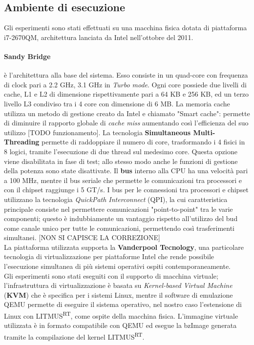\newpage

\subsection{Ambiente di esecuzione}
\label{sec:ambiente}

\noindent Gli esperimenti sono stati effettuati su una macchina fisica dotata di piattaforma i7-2670QM, architettura lanciata da Intel nell'ottobre del 2011.\\

\paragraph{Sandy Bridge} è l'architettura alla base del sistema. Esso consiste in un quad-core con frequenza di clock pari a 2.2 GHz, 3.1 GHz in \textit{Turbo mode}. Ogni core possiede due livelli di cache, L1 e L2 di dimensione rispettivamente pari a 64 KB e 256 KB, ed un terzo livello L3 condiviso tra i 4 core con dimensione di 6 MB. La memoria cache utilizza un metodo di gestione creato da Intel e chiamato "Smart cache": permette di diminuire il rapporto globale di \textit{cache miss} aumentando così l'efficienza del suo utilizzo [TODO funzionamento]. La tecnologia \textbf{Simultaneous Multi-Threading} permette di raddoppiare il numero di core, trasformando i 4 fisici in 8 logici, tramite l'esecuzione di due thread sul medesimo core. Questa opzione viene disabilitata in fase di test; allo stesso modo anche le funzioni di gestione della potenza sono state disattivate. Il \textbf{bus} interno alla CPU ha una velocità pari a 100 MHz, mentre il bus seriale che permette le comunicazioni tra processori e con il chipset raggiunge i 5 GT/s. I bus per le connessioni tra processori e chipset utilizzano la tecnologia \textit{QuickPath Interconnect} (QPI), la cui caratteristica principale consiste nel permettere comunicazioni "point-to-point" tra le varie componenti; questo è indubbiamente un vantaggio rispetto all'utilizzo del bud come canale unico per tutte le comunicazioni, permettendo così trasferimenti simultanei. [NON SI CAPISCE LA CORREZIONE]\\
La piattaforma utilizzata supporta la \textbf{Vanderpool Tecnology}, una particolare tecnologia di virtualizzazione per piattaforme Intel che rende possibile l'esecuzione simultanea di più sistemi operativi ospiti contemporaneamente.\\

\noindent Gli esperimenti sono stati eseguiti con il supporto di macchina virtuale; l'infrastruttura di virtualizzazione è basata su \textit{Kernel-based Virtual Machine} (\textbf{KVM}) che è specifica per i sistemi Linux, mentre il software di emulazione QEMU permette di eseguire il sistema operativo, nel nostro caso l'estensione di Linux con LITMUS\textsuperscript{RT}, come ospite della macchina fisica. L'immagine virtuale utilizzata è in formato compatibile con QEMU ed esegue la bzImage generata tramite la compilazione del kernel LITMUS\textsuperscript{RT}.\\

